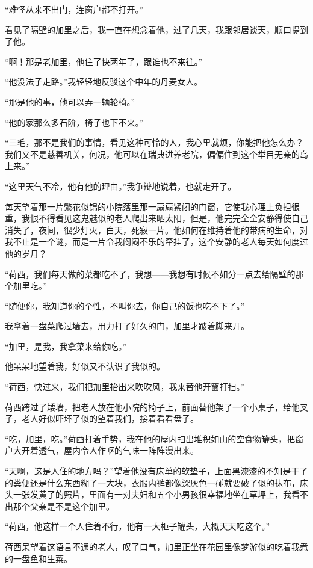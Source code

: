 \par “难怪从来不出门，连窗户都不打开。”
\par 看见了隔壁的加里之后，我一直在想念着他，过了几天，我跟邻居谈天，顺口提到了他。
\par “啊！那是老加里，他住了快两年了，跟谁也不来往。”
\par “他没法子走路。”我轻轻地反驳这个中年的丹麦女人。
\par “那是他的事，他可以弄一辆轮椅。”
\par “他的家那么多石阶，椅子也下不来。”
\par “三毛，那不是我们的事情，看见这种可怜的人，我心里就烦，你能把他怎么办？我们又不是慈善机关，何况，他可以在瑞典进养老院，偏偏住到这个举目无亲的岛上来。”
\par “这里天气不冷，他有他的理由。”我争辩地说着，也就走开了。
\par 每天望着那一片繁花似锦的小院落里那一扇扇紧闭的门窗，它使我心理上负担很重，我恨不得看见这鬼魅似的老人爬出来晒太阳，但是，他完完全全安静得使自己消失了，夜间，很少灯火，白天，死寂一片。他如何在维持着他的带病的生命，对我不止是一个谜，而是一片令我闷闷不乐的牵挂了，这个安静的老人每天如何度过他的岁月？
\par “荷西，我们每天做的菜都吃不了，我想——我想有时候不如分一点去给隔壁的那个加里吃。”
\par “随便你，我知道你的个性，不叫你去，你自己的饭也吃不下了。”
\par 我拿着一盘菜爬过墙去，用力打了好久的门，加里才跛着脚来开。
\par “加里，是我，我拿菜来给你吃。”
\par 他呆呆地望着我，好似又不认识了我似的。
\par “荷西，快过来，我们把加里抬出来吹吹风，我来替他开窗打扫。”
\par 荷西跨过了矮墙，把老人放在他小院的椅子上，前面替他架了一个小桌子，给他叉子，老人好似吓坏了似的望着我们，接着看看盘子。
\par “吃，加里，吃。”荷西打着手势，我在他的屋内扫出堆积如山的空食物罐头，把窗户大开着透气，屋内令人作呕的气味一阵阵漫出来。
\par “天啊，这是人住的地方吗？”望着他没有床单的软垫子，上面黑漆漆的不知是干了的粪便还是什么东西糊了一大块，衣服内裤都像深灰色一碰就要破了似的抹布，床头一张发黄了的照片，里面有一对夫妇和五个小男孩很幸福地坐在草坪上，我看不出那个父亲是不是这个加里。
\par “荷西，他这样一个人住着不行，他有一大柜子罐头，大概天天吃这个。”
\par 荷西呆望着这语言不通的老人，叹了口气，加里正坐在花园里像梦游似的吃着我煮的一盘鱼和生菜。
